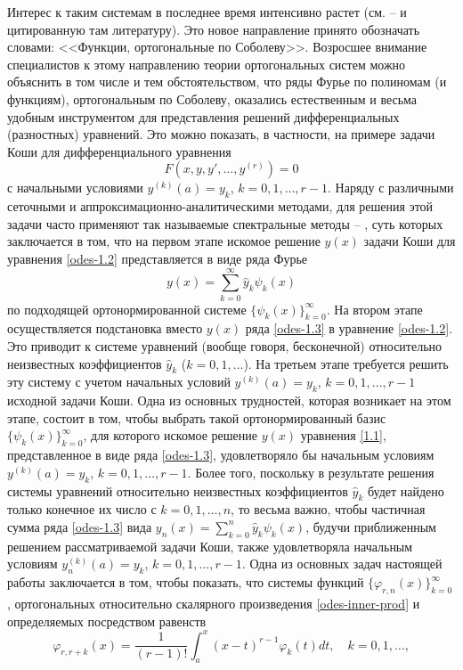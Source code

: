 Интерес к таким системам  в последнее время интенсивно растет  (см. \cite{Shar2016} -- \cite{Shar13}  и цитированную там литературу). Это новое направление принято обозначать словами: <<Функции, ортогональные по Соболеву>>. Возросшее  внимание специалистов  к этому направлению теории ортогональных систем можно объяснить в том числе и тем обстоятельством, что ряды Фурье по полиномам (и функциям), ортогональным по Соболеву, оказались естественным и весьма удобным инструментом для представления решений  дифференциальных (разностных) уравнений. Это можно показать, в частности, на примере  задачи Коши для  дифференциального уравнения
\begin{equation}\label{odes-1.2}
F(x,y,y',\ldots,y^{(r)})=0
 \end{equation}
с начальными условиями $y^{(k)}(a)=y_k$, $k=0,1,\ldots,r-1$.  Наряду с различными сеточными и аппроксимационно-аналитическими методами, для решения этой задачи часто применяют так называемые спектральные методы \cite{Tref1} -- \cite{Shar18}, суть которых  заключается в том, что на первом этапе искомое решение $y(x)$ задачи Коши для уравнения \eqref{odes-1.2} представляется в виде ряда Фурье
\begin{equation}\label{odes-1.3}
 y(x)=\sum_{k=0}^\infty \hat y_k\psi_k(x)
 \end{equation}
по подходящей ортонормированной системе $\{\psi_k(x)\}_{k=0}^\infty$. На втором этапе осуществляется подстановка вместо $y(x)$ ряда \eqref{odes-1.3} в уравнение \eqref{odes-1.2}. Это приводит к системе уравнений (вообще говоря, бесконечной) относительно неизвестных коэффициентов $\hat y_k$ ($k=0,1,\ldots$). На третьем этапе требуется решить эту систему с учетом начальных условий  $y^{(k)}(a)=y_k$, $k=0,1,\ldots,r-1$ исходной задачи Коши.
Одна из основных трудностей, которая возникает на этом этапе, состоит в том, чтобы
выбрать такой ортонормированный базис $\{\psi_k(x)\}_{k=0}^\infty$, для которого искомое решение $y(x)$ уравнения \eqref{1.1}, представленное в виде ряда  \eqref{odes-1.3}, удовлетворяло бы начальным условиям $y^{(k)}(a)=y_k$, $k=0,1,\ldots,r-1$. Более того, поскольку в результате решения системы уравнений относительно неизвестных коэффициентов $\hat y_k$  будет найдено только конечное их число с $k=0,1,\ldots, n$, то весьма важно, чтобы частичная сумма ряда \eqref{odes-1.3} вида $ y_n(x)=\sum_{k=0}^n\hat y_k\psi_k(x)$,
 будучи приближенным решением рассматриваемой задачи Коши, также удовлетворяла начальным условиям $y_n^{(k)}(a)=y_k$, $k=0,1,\ldots,r-1$. Одна из основных задач настоящей работы заключается в том, чтобы показать, что системы функций
 $ \{\varphi_{r,n}(x)\}_{k=0}^\infty$, ортогональных относительно скалярного произведения \eqref{odes-inner-prod} и определяемых посредством равенств
  \begin{equation}\label{odes-1.4}
\varphi_{r,r+k}(x) =\frac{1}{(r-1)!}\int_a^x(x-t)^{r-1}\varphi_{k}(t)dt, \quad k=0,1,\ldots,
\end{equation}

